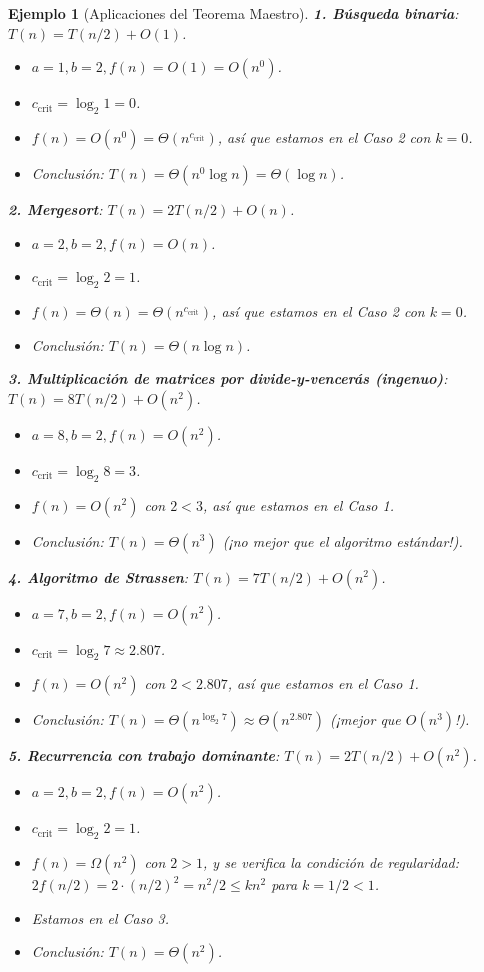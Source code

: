 \documentclass[a4paper,11pt]{report}
\newtheorem{example}[theorem]{Ejemplo}
\begin{document}
\begin{example}[Aplicaciones del Teorema Maestro]

\textbf{1. Búsqueda binaria}: $T(n) = T(n/2) + O(1)$.
\begin{itemize}
\item $a = 1, b = 2, f(n) = O(1) = O(n^0)$.
\item $c_{\text{crit}} = \log_2 1 = 0$.
\item $f(n) = O(n^0) = \Theta(n^{c_{\text{crit}}})$, así que estamos en el Caso 2 con $k=0$.
\item Conclusión: $T(n) = \Theta(n^0 \log n) = \Theta(\log n)$.
\end{itemize}

\textbf{2. Mergesort}: $T(n) = 2T(n/2) + O(n)$.
\begin{itemize}
\item $a = 2, b = 2, f(n) = O(n)$.
\item $c_{\text{crit}} = \log_2 2 = 1$.
\item $f(n) = \Theta(n) = \Theta(n^{c_{\text{crit}}})$, así que estamos en el Caso 2 con $k=0$.
\item Conclusión: $T(n) = \Theta(n \log n)$.
\end{itemize}

\textbf{3. Multiplicación de matrices por divide-y-vencerás (ingenuo)}: $T(n) = 8T(n/2) + O(n^2)$.
\begin{itemize}
\item $a = 8, b = 2, f(n) = O(n^2)$.
\item $c_{\text{crit}} = \log_2 8 = 3$.
\item $f(n) = O(n^2)$ con $2 < 3$, así que estamos en el Caso 1.
\item Conclusión: $T(n) = \Theta(n^3)$ (¡no mejor que el algoritmo estándar!).
\end{itemize}

\textbf{4. Algoritmo de Strassen}: $T(n) = 7T(n/2) + O(n^2)$.
\begin{itemize}
\item $a = 7, b = 2, f(n) = O(n^2)$.
\item $c_{\text{crit}} = \log_2 7 \approx 2.807$.
\item $f(n) = O(n^2)$ con $2 < 2.807$, así que estamos en el Caso 1.
\item Conclusión: $T(n) = \Theta(n^{\log_2 7}) \approx \Theta(n^{2.807})$ (¡mejor que $O(n^3)$!).
\end{itemize}

\textbf{5. Recurrencia con trabajo dominante}: $T(n) = 2T(n/2) + O(n^2)$.
\begin{itemize}
\item $a = 2, b = 2, f(n) = O(n^2)$.
\item $c_{\text{crit}} = \log_2 2 = 1$.
\item $f(n) = \Omega(n^2)$ con $2 > 1$, y se verifica la condición de regularidad: $2f(n/2) = 2 \cdot (n/2)^2 = n^2/2 \leq k n^2$ para $k = 1/2 < 1$.
\item Estamos en el Caso 3.
\item Conclusión: $T(n) = \Theta(n^2)$.
\end{itemize}
\end{example}
\end{document}
